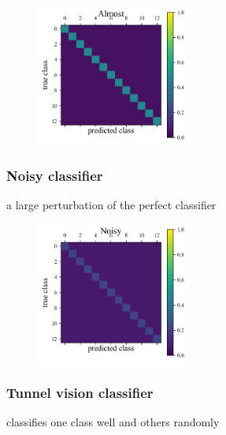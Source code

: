 \begin{figure}
	\begin{center}
		\includegraphics[width=0.45\textwidth]{./fig/Almost.png}\\
		\caption{}
		\label{fig:almost_data}
	\end{center}
\end{figure}

\subsubsection{Noisy classifier}
\label{sec:nois_datay}

a large perturbation of the perfect classifier

\begin{figure}
	\begin{center}
		\includegraphics[width=0.45\textwidth]{./fig/Noisy.png}\\
		\caption{}
		\label{fig:noisy_data}
	\end{center}
\end{figure}

\subsubsection{Tunnel vision classifier}
\label{sec:tunnel_data}

classifies one class well and others randomly

